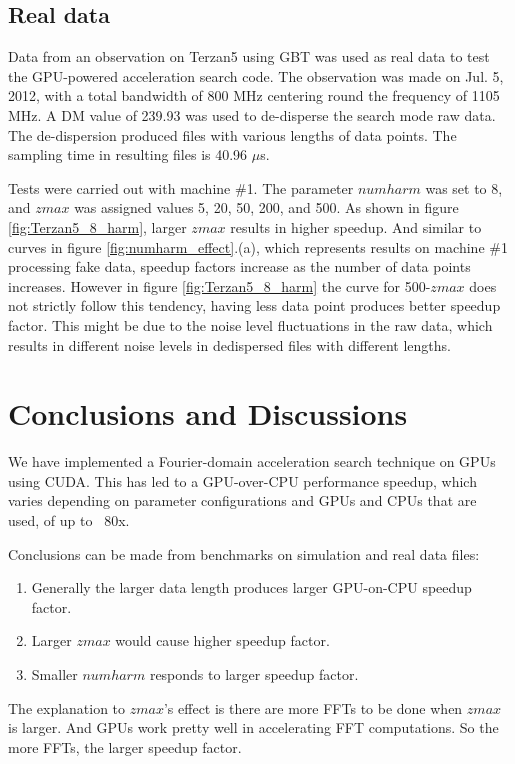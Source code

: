 \documentclass[preprint2]{aastex}
\begin{document}
\subsection{Real data}
Data from an observation on Terzan5 using GBT was used as real data to test the GPU-powered acceleration search code. The 
observation was made on Jul. 5, 2012, with a total bandwidth of 800 MHz centering round the frequency of 1105 MHz. 
A DM value of 239.93
was used to de-disperse the search mode raw data. The de-dispersion produced files with various lengths of data points. 
The sampling time in resulting files is 40.96 $\mu$s.

Tests were carried out with machine {\#}1. The parameter $numharm$ was set to 8, and $zmax$ was assigned values 
5, 20, 50, 200, and 500. As shown in figure \ref{fig:Terzan5_8_harm}, larger $zmax$ results in higher speedup. 
And similar to curves in figure \ref{fig:numharm_effect}.(a), which represents results on machine {\#}1 processing fake data, 
speedup factors increase as the number of data points increases. However in figure \ref{fig:Terzan5_8_harm} the curve 
for 500-$zmax$ does not strictly follow this tendency, having less data point produces better speedup factor. 
This might be due to the noise level fluctuations in the raw data, 
which results in different noise levels in dedispersed files
with different lengths.

\section{Conclusions and Discussions}
We have implemented a Fourier-domain acceleration search technique on GPUs using CUDA. This has led to a 
GPU-over-CPU performance speedup, which varies depending on parameter configurations and GPUs and CPUs 
that are used, of up to ~80x. 

Conclusions can be made from benchmarks on simulation and real data files:
\begin{enumerate}
  \item Generally the larger data length produces larger GPU-on-CPU speedup factor.
  \item Larger $zmax$ would cause higher speedup factor.
  \item Smaller $numharm$ responds to larger speedup factor.
\end{enumerate}

The explanation to $zmax$'s effect is there are more FFTs to be done when $zmax$ is larger. And GPUs work pretty well in 
accelerating FFT computations. So the more FFTs, the larger speedup factor.
\end{document}
